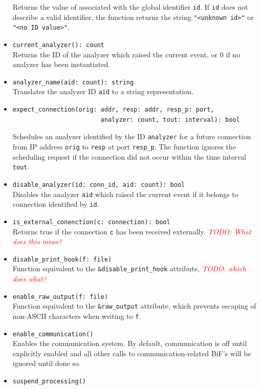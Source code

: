 \documentclass[10pt,landscape]{article}
\def\todo#1{\textit{\textcolor{red}{TODO: #1}}}
\begin{document}
\begin{multicols*}{2}
\begin{itemize}
    Returns the value of associated with the global identifier \verb|id|. If
    \verb|id| does not describe a valid identifier, the function returns the
    string \verb|"<unknown id>"| or \verb|"<no ID value>"|.
  \item \verb|current_analyzer(): count|\\
    Returns the ID of the analyzer which raised the current event, or 0 if no
    analyzer has been instantiated.
  \item \verb|analyzer_name(aid: count): string|\\
    Translates the analyzer ID \verb|aid| to a string representation.
  \item \begin{verbatim}
expect_connection(orig: addr, resp: addr, resp_p: port,
          				analyzer: count, tout: interval): bool
    \end{verbatim}
    Schedules an analyzer identified by the ID \verb|analyzer| for a future
    connection from IP address \verb|orig| to \verb|resp| at port
    \verb|resp_p|. The function ignores the scheduling request if the
    connection did not occur within the time interval \verb|tout|.
  \item \verb|disable_analyzer(id: conn_id, aid: count): bool|\\
    Disables the analyzer \verb|aid| which raised the current event if it
    belongs to connection identified by \verb|id|.
  \item \verb|is_external_conenction(c: connection): bool|\\
    Returns true if the connection \verb|c| has been received externally.
    \todo{What does this mean?}
  \item \verb|disable_print_hook(f: file)|\\
    Function equivalent to the \verb|&disable_print_hook| attribute,
    \todo{which does what?}
  \item \verb|enable_raw_output(f: file)|\\
    Function equivalent to the \verb|&raw_output| attribute, which prevents
    escaping of non-ASCII characters when writing to \verb|f|.
  \item \verb|enable_communication()|\\
    Enables the communication system. By default, communication is off until
    explicitly enabled and all other calls to communication-related BiF's will
    be ignored until done so.
  \item \verb|suspend_processing()|\\

\end{itemize}
\end{multicols*}
\end{document}
